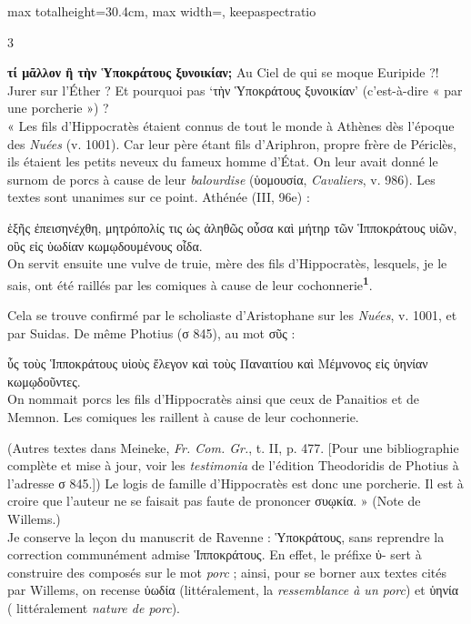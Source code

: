 \documentclass[11pt,twoside]{book}
\newcommand{\italique}[1]{\textit{#1}}
\newcommand{\citComm}[1]{\begin{quoting}[vskip=0.4pt,leftmargin=0.7em,rightmargin=0.2em]#1\end{quoting}}
\newcommand{\grec}[1]{{\policeGr #1}}
\newcommand{\marqueur}[1]{\textsuperscript{\color{rubricRed}\textbf{#1}}}
\begin{document}
\begin{adjustbox}{max totalheight=30.4cm, max width=\textwidth, keepaspectratio}
\begin{minipage}{\textwidth}
{\begin{multicols}{3}
\par\vspace{1.5pt}
 \textbf{τί μᾶλλον ἢ τὴν Ὑποκράτους ξυνοικίαν;} Au Ciel de qui se moque Euripide ?! Jurer sur l'Éther ? Et pourquoi pas `τὴν Ὑποκράτους ξυνοικίαν' (c'est-à-dire « par une porcherie ») ?\\ « Les fils d'Hippocratès étaient connus de tout le monde à Athènes dès l'époque des \italique{Nuées} (v. 1001). Car leur père étant fils d'Ariphron, propre frère de Périclès, ils étaient les petits neveux du fameux homme d'État. On leur avait donné le surnom de porcs à cause de leur \italique{balourdise} (ὑομουσία, \italique{Cavaliers}, v. 986). Les textes sont unanimes sur ce point. Athénée (III, 96e) :
\citComm{ἑξῆς ἐπεισηνέχθη, μητρόπολίς τις ὡς ἀληθῶς οὖσα καὶ μήτηρ τῶν Ἱπποκράτους υἱῶν, οὓς εἰς ὑωδίαν κωμῳδουμένους οἶδα.\\
On servit ensuite une vulve de truie, mère des fils d'Hippocratès, lesquels, je le sais, ont été raillés par les comiques à cause de leur cochonnerie\marqueur{1}.}
\par\vspace{1.5pt}
\noindent Cela se trouve confirmé par le scholiaste d'Aristophane sur les \italique{Nuées}, v. 1001, et par Suidas. De même Photius (σ 845), au mot σῦς :
\citComm{ὗς τοὺς Ἱπποκράτους υἱοὺς ἔλεγον καὶ τοὺς Παναιτίου καὶ Μέμνονος εἰς ὑηνίαν κωμῳδοῦντες.\\
On nommait porcs les fils d'Hippocratès ainsi que ceux de Panaitios et de Memnon. Les comiques les raillent à cause de leur cochonnerie.}
\par\vspace{1.5pt}
\noindent (Autres textes dans Meineke, \italique{Fr. Com. Gr.}, t. II, p. 477. [Pour une bibliographie complète et mise à jour, voir les \italique{testimonia} de l'édition Theodoridis de Photius à l'adresse σ 845.]) Le logis de famille d'Hippocratès est donc une porcherie. Il est à croire que l'auteur ne se faisait pas faute de prononcer συῳκία. » (Note de Willems.) \\ Je conserve la leçon du manuscrit de Ravenne : \grec{Ὑποκράτους}, sans reprendre la correction communément admise \grec{Ἱπποκράτους}. En effet, le préfixe \grec{ὑ}- sert à construire des composés sur le mot \italique{porc} ; ainsi, pour se borner aux textes cités par Willems, on recense \grec{ὑωδία} (littéralement, la \italique{ressemblance à un porc}) et \grec{ὑηνία} ( littéralement \italique{nature de porc}).
\par\vspace{1.5pt}

\end{multicols}}
\end{minipage}
\end{adjustbox}
\end{document}
